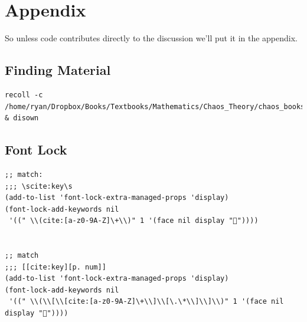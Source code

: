\documentclass[11pt]{article}
\begin{document}
\section{Appendix}
\label{appendix}
So unless code contributes directly to the discussion we'll put it in the appendix.
\subsection{Finding Material}
\label{sec:org7c67192}
\begin{verbatim}
recoll -c /home/ryan/Dropbox/Books/Textbooks/Mathematics/Chaos_Theory/chaos_books_recoll & disown
\end{verbatim}
\subsection{Font Lock}
\label{sec:orgc96b14e}
\begin{verbatim}
;; match:
;;; \scite:key\s
(add-to-list 'font-lock-extra-managed-props 'display)
(font-lock-add-keywords nil
 '((" \\(cite:[a-z0-9A-Z]\+\\)" 1 '(face nil display "🤔"))))


;; match
;;; [[cite:key][p. num]]
(add-to-list 'font-lock-extra-managed-props 'display)
(font-lock-add-keywords nil
 '((" \\(\\[\\[cite:[a-z0-9A-Z]\+\\]\\[\.\*\\]\\]\\)" 1 '(face nil display "🤔"))))
\end{verbatim}
\end{document}
